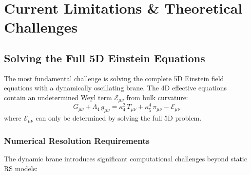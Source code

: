 
\chapter{Current Limitations \& Theoretical Challenges}
\label{ch:limitations}

\section{Solving the Full 5D Einstein Equations}
\label{sec:5d_einstein}

The most fundamental challenge is solving the complete 5D Einstein field equations with a dynamically oscillating brane. The 4D effective equations contain an undetermined Weyl term $\mathcal{E}_{\mu\nu}$ from bulk curvature:
\begin{equation}
G_{\mu\nu} + \Lambda_4\,g_{\mu\nu} = \kappa_4^2\,T_{\mu\nu} + \kappa_5^4\,\pi_{\mu\nu} - \mathcal{E}_{\mu\nu}
\end{equation}
where $\mathcal{E}_{\mu\nu}$ can only be determined by solving the full 5D problem.

\subsection{Numerical Resolution Requirements}

The dynamic brane introduces significant computational challenges beyond static RS models:

